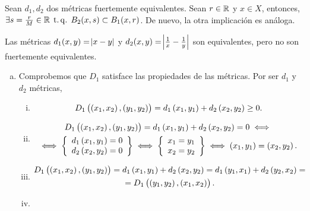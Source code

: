 \begin{ej}
	Sean $d_1, d_2$ dos m\'etricas fuertemente equivalentes. Sean $r \in \mathbb{R}$ y $x \in X$, entonces, $\exists s = \frac{r}{M} \in \mathbb{R} \operatorname{\;t.q.\;} B_2(x, s) \subset B_1(x, r)$.
	De nuevo, la otra implicación es análoga.

	Las m\'etricas $d_1(x,y) = \abs{x-y}$ y $d_2(x,y) = \abs{\frac{1}{x} - \frac{1}{y}}$ son equivalentes, pero no son fuertemente equivalentes.
\end{ej}


\begin{ej}
	\begin{enumerate}[(a)]
		\item Comprobemos que $D_1$ satisface las propiedades de las métricas. Por ser $d_1$ y $d_2$ métricas,
		\begin{enumerate}[i)]
            \item 
            \[
                D_1 \left( \left( x_1, x_2 \right) , \left( y_1 , y_2 \right) \right) = d_1 \left( x_1, y_1\right) + d_2 \left( x_2 , y_2 \right) \geq 0.
            \]
            \item 
            \begin{gather*}
                D_1 \left( \left( x_1, x_2 \right) , \left( y_1 , y_2 \right) \right) = d_1 \left( x_1, y_1\right) + d_2 \left( x_2 , y_2 \right) = 0 \iff \\
                \iff \left\{ \begin{array}{c}
                    d_1 \left( x_1, y_1 \right) = 0 \\
                    d_2 \left( x_2, y_2 \right) = 0
                \end{array} \right\} \iff \left\{ \begin{array}{c}
                    x_1=y_1 \\
                    x_2=y_2
                \end{array} \right\} \iff \left( x_1, y_1 \right) = \left( x_2, y_2 \right).
            \end{gather*}
            \item 
            \begin{gather*}
                D_1 \left( \left( x_1, x_2 \right) , \left( y_1 , y_2 \right) \right) = d_1 \left( x_1, y_1 \right) + d_2 \left( x_2 , y_2 \right) = d_1 \left( y_1, x_1 \right) + d_2 \left( y_2 , x_2 \right)= \\
                =D_1 \left( \left( y_1, y_2 \right) , \left( x_1 , x_2 \right) \right) .
            \end{gather*}
            \item 
            \begin{gather*}

\end{gather*}
\end{enumerate}
\end{enumerate}
\end{ej}
